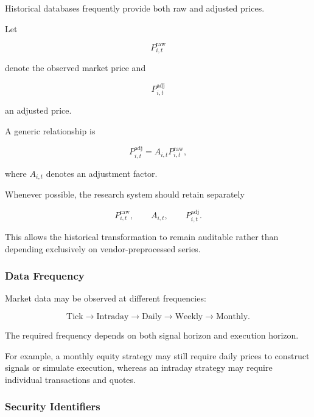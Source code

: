 \documentclass[11pt,a4paper]{article}
\begin{document}
Historical databases frequently provide both raw and adjusted prices.

Let

\begin{equation}
P_{i,t}^{\mathrm{raw}}
\end{equation}

denote the observed market price and

\begin{equation}
P_{i,t}^{\mathrm{adj}}
\end{equation}

an adjusted price.

A generic relationship is

\begin{equation}
P_{i,t}^{\mathrm{adj}}
=
A_{i,t}
P_{i,t}^{\mathrm{raw}},
\end{equation}

where $A_{i,t}$ denotes an adjustment factor.

Whenever possible, the research system should retain separately

\begin{equation}
\boxed{
P_{i,t}^{\mathrm{raw}},
\qquad
A_{i,t},
\qquad
P_{i,t}^{\mathrm{adj}}.
}
\end{equation}

This allows the historical transformation to remain auditable rather than
depending exclusively on vendor-preprocessed series.


\subsubsection{Data Frequency}

Market data may be observed at different frequencies:

\begin{equation}
\boxed{
\text{Tick}
\rightarrow
\text{Intraday}
\rightarrow
\text{Daily}
\rightarrow
\text{Weekly}
\rightarrow
\text{Monthly}.
}
\end{equation}

The required frequency depends on both signal horizon and execution horizon.

For example, a monthly equity strategy may still require daily prices to
construct signals or simulate execution, whereas an intraday strategy may
require individual transactions and quotes.


\subsubsection{Security Identifiers}
\end{document}
